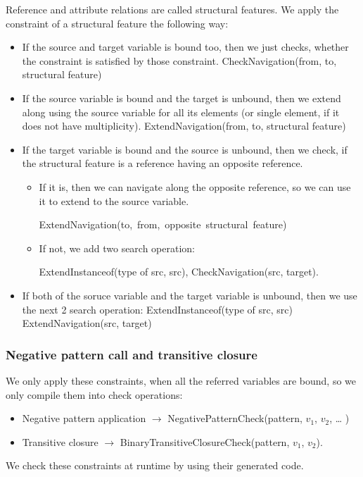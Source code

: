 Reference and attribute relations are called structural features.
We apply the constraint of a structural feature the following way:
\begin{itemize}
	\item 
	If the source and target variable is bound too, then we just checks, whether the constraint is satisfied by those constraint.
	\newline CheckNavigation(from, to, structural feature)
	
	\item 
	If the source variable is bound and the target is unbound, then we extend along using the source variable for all its elements (or single element, if it does not have multiplicity). 
	\newline ExtendNavigation(from, to, structural feature)
	
	\item 
	If the target variable is bound and the source is unbound, then we check, if the structural feature is a reference having an opposite reference. 
	\begin{itemize}
		\item If it is, then we can navigate along the opposite reference, so we can use it to extend to the source variable. 
		
		\mbox{ExtendNavigation(to, from, opposite structural feature)}
		\item If not, we add two search operation: 
		
		ExtendInstanceof(type of src, src), CheckNavigation(src, target). 
	\end{itemize}

	\item If both of the soruce variable and the target variable is unbound, then we use the next 2 search operation: 
	\newline ExtendInstanceof(type of src, src)
	\newline ExtendNavigation(src, target)

\end{itemize}


\subsubsection{Negative pattern call and transitive closure}

We only apply these constraints, when all the referred variables are bound, so we only compile them into check operations:
\begin{itemize}
	\item Negative pattern application $\rightarrow{}$ NegativePatternCheck(pattern, $v_1$, $v_2$, \dots{} )
	\item Transitive closure $\rightarrow{}$ BinaryTransitiveClosureCheck(pattern, $v_1$, $v_2$).
\end{itemize}
We check these constraints at runtime by using their generated code.


